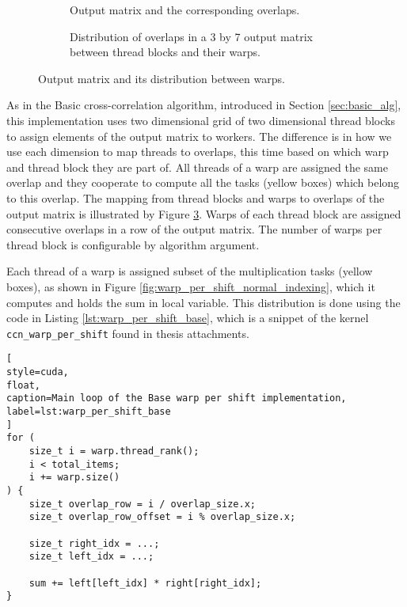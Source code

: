 \begin{figure}[ht]
	\centering	
	\begin{subfigure}{0.55\textwidth}
		\fontsize{6}{8}\selectfont
		\centering
		\def\svgwidth{\textwidth}
		
		\caption{Output matrix and the corresponding overlaps.}
		\label{fig:warp_per_shift_overlaps}
	\end{subfigure}
	\hfill
	\begin{subfigure}{0.4\textwidth}
		\centering
		\def\svgwidth{\textwidth}
		\fontsize{6}{8}\selectfont
		
		\caption{Distribution of overlaps in a 3 by 7 output matrix between thread blocks and their warps.}
		\label{fig:warp_per_shift_warps}
	\end{subfigure}
	
	\caption{Output matrix and its distribution between warps.}
\end{figure}

As in the Basic cross-correlation algorithm, introduced in Section \ref{sec:basic_alg}, this implementation uses two dimensional grid of two dimensional thread blocks to assign elements of the output matrix to workers. The difference is in how we use each dimension to map threads to overlaps, this time based on which warp and thread block they are part of. All threads of a warp are assigned the same overlap and they cooperate to compute all the tasks (yellow boxes) which belong to this overlap. The mapping from thread blocks and warps to overlaps of the output matrix is illustrated by Figure \ref{fig:warp_per_shift_warps}. Warps of each thread block are assigned consecutive overlaps in a row of the output matrix. The number of warps per thread block is configurable by algorithm argument.

Each thread of a warp is assigned subset of the multiplication tasks (yellow boxes), as shown in Figure \ref{fig:warp_per_shift_normal_indexing}, which it computes and holds the sum in local variable. This distribution is done using the code in Listing \ref{lst:warp_per_shift_base}, which is a snippet of the kernel \texttt{ccn\_warp\_per\_shift} found  in thesis attachments.

\begin{lstlisting}[
style=cuda,
float,
caption=Main loop of the Base warp per shift implementation,
label=lst:warp_per_shift_base
]
for (
	size_t i = warp.thread_rank(); 
	i < total_items; 
	i += warp.size()
) {
	size_t overlap_row = i / overlap_size.x;
	size_t overlap_row_offset = i % overlap_size.x;

	size_t right_idx = ...;
	size_t left_idx = ...;

	sum += left[left_idx] * right[right_idx];
}
\end{lstlisting}


